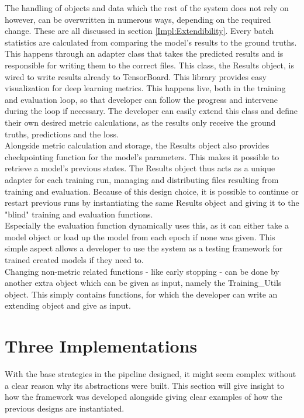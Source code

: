 The handling of objects and data which the rest of the system does not rely on however, can be overwritten in numerous ways, depending on the required change. These are all discussed in section \ref{Impl:Extendibility}. Every batch statistics are calculated from comparing the model's results to the ground truths. This happens through an adapter class that takes the predicted results and is responsible for writing them to the correct files. This class, the Results object, is wired to write results already to TensorBoard. This library provides easy visualization for deep learning metrics. This happens live, both in the training and evaluation loop, so that developer can follow the progress and intervene during the loop if necessary. The developer can easily extend this class and define their own desired metric calculations, as the results only receive the ground truths, predictions and the loss. \\

Alongside metric calculation and storage, the Results object also provides checkpointing function for the model's parameters. This makes it possible to retrieve a model's previous states. The Results object thus acts as a unique adapter for each training run, managing and distributing files resulting from training and evaluation. Because of this design choice, it is possible to continue or restart previous runs by instantiating the same Results object and giving it to the "blind" training and evaluation functions. \\

Especially the evaluation function dynamically uses this, as it can either take a model object or load up the model from each epoch if none was given. This simple aspect allows a developer to use the system as a testing framework for trained created models if they need to. \\

Changing non-metric related functions - like early stopping - can be done by another extra object which can be given as input, namely the Training\_Utils object. This simply contains functions, for which the developer can write an extending object and give as input. \\ 

\section{Three Implementations} \label{Design:Implementations}

With the base strategies in the pipeline designed, it might seem complex without a clear reason why its abstractions were built. This section will give insight to how the framework was developed alongside giving clear examples of how the previous designs are instantiated. \\

